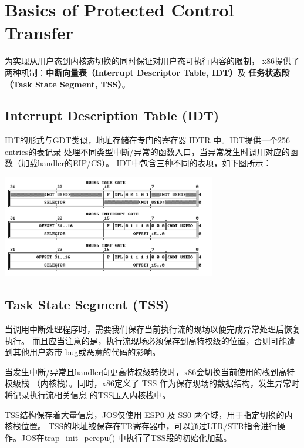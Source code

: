 \documentclass[12pt, letterpaper]{report}
\begin{document}
\newpage
\section[\large Basics of Protected Control Transfer]{Basics of Protected Control Transfer}
为实现从用户态到内核态切换的同时保证对用户态可执行内容的限制，
x86提供了两种机制：{\bf 中断向量表（Interrupt Descriptor Table, IDT）}及
{\bf 任务状态段（Task State Segment, TSS）}。\par 
\subsection{\large Interrupt Description Table (IDT)}
IDT的形式与GDT类似，地址存储在专门的寄存器 IDTR 中。IDT提供一个256 entries的表记录
处理不同类型中断/异常的函数入口，当异常发生时调用对应的函数（加载handler的EIP/CS）。
IDT中包含三种不同的表项，如下图所示：\par 
{
\centering
\includegraphics[width=0.7\textwidth]{IDTD} \par
}
\quad \par 

\subsection{\large Task State Segment (TSS)}
当调用中断处理程序时，需要我们保存当前执行流的现场以便完成异常处理后恢复执行。
而且应当注意的是，执行流现场必须保存到高特权级的位置，否则可能遭到其他用户态带
bug或恶意的代码的影响。\par 
当发生中断/异常且handler向更高特权级转换时，x86会切换当前使用的栈到高特权级栈
（内核栈）。同时，x86定义了 TSS 作为保存现场的数据结构，发生异常时将记录执行流相关信息
的TSS压入内核栈中。\par 
TSS结构保存着大量信息，JOS仅使用 ESP0 及 SS0 两个域，用于指定切换的内核栈位置。
\underline{TSS的地址被保存在TR寄存器中，可以通过LTR/STR指令进行操作}。JOS在trap\_init\_percpu()
中执行了TSS段的初始化加载。

\newpage
\end{document}
